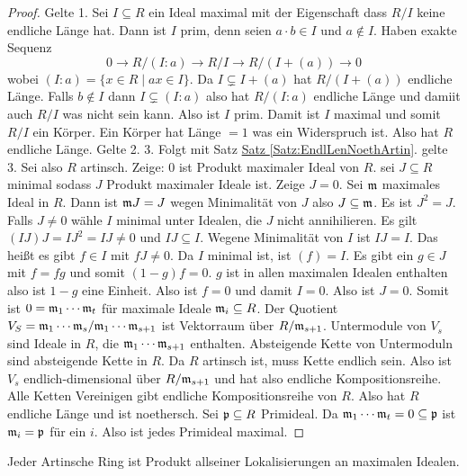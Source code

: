 \begin{proof}
    Gelte 1. Sei \(I\subseteq R\) ein Ideal maximal mit der Eigenschaft dass \(R/I\) keine endliche Länge hat. Dann ist \(I\) prim, denn seien \(a\cdot b\in I\) und \(a\not\in I\). Haben exakte Sequenz
    \[0\to R/(I:a)\to R/I\to R/(I+(a))\to 0\] wobei \((I:a)=\{x\in R\mid ax\in I\}\). Da \(I\subsetneq I+(a)\) hat \(R/(I+(a))\) endliche Länge. Falls \(b\not\in I\) dann \(I\subsetneq (I:a)\) also hat \(R/(I:a)\) endliche Länge und damiit auch \(R/I\) was nicht sein kann. Also ist \(I\) prim. Damit ist \(I\) maximal und somit \(R/I\) ein Körper. Ein Körper hat Länge \(=1\) was ein Widerspruch ist.
    Also hat \(R\) endliche Länge.
    Gelte 2. 3. Folgt mit Satz \hyperref[Satz:EndlLenNoethArtin]{Satz \ref{Satz:EndlLenNoethArtin}}. gelte 3. Sei also \(R\) artinsch. Zeige: \(0\) ist Produkt maximaler Ideal von \(R\).
    sei \(J\subseteq R\) minimal sodass \(J\) Produkt maximaler Ideale ist. Zeige \(J=0\).
    Sei \(\mathfrak{m} \) maximales Ideal in \(R\). Dann ist \(\mathfrak{m} J=J\) wegen Minimalität von \(J\) also \(J\subseteq \mathfrak{m}\). Es ist \(J^2=J\).
    Falls \(J\neq 0\) wähle \(I\) minimal unter Idealen, die \(J\) nicht annihilieren.
    Es gilt \((IJ)J=IJ^2=IJ\neq 0\) und \(IJ\subseteq I\). Wegene Minimalität von \(I\) ist \(IJ=I\). Das heißt es gibt \(f\in I\) mit \(fJ\neq 0\). Da \(I\) minimal ist, ist \((f)=I\). Es gibt ein \(g\in J\) mit \(f=fg\) und somit \((1-g)f=0\).
    \(g\) ist in allen maximalen Idealen enthalten also ist \(1-g\) eine Einheit. Also ist \(f=0\) und damit \(I=0\). Also ist \(J=0\).
    Somit ist \(0=\mathfrak{m}_1\cdots \mathfrak{m}_t\) für maximale Ideale \(\mathfrak{m}_i\subseteq R\).
    Der Quotient \(V_S=\mathfrak{m}_1\cdots \mathfrak{m}_s/\mathfrak{m}_1\cdots \mathfrak{m}_{s+1}\) ist Vektorraum über \(R/\mathfrak{m}_{s+1}\). Untermodule von \(V_s\) sind Ideale in \(R\), die \(\mathfrak{m}_1\cdots \mathfrak{m}_{s+1}\) enthalten.
    Absteigende Kette von Untermoduln sind absteigende Kette in \(R\). Da \(R\) artinsch ist, muss Kette endlich sein.
    Also ist \(V_s\) endlich-dimensional über \(R/\mathfrak{m}_{s+1}\) und hat also endliche Kompositionsreihe. Alle Ketten Vereinigen gibt endliche Kompositionsreihe von \(R\). Also hat \(R\) endliche Länge und ist noethersch. Sei \(\mathfrak{p}\subseteq R\) Primideal. Da \(\mathfrak{m}_1\cdots \mathfrak{m}_t=0\subseteq \mathfrak{p}\) ist \(\mathfrak{m}_i=\mathfrak{p}\) für ein \(i\). Also ist jedes Primideal maximal.
\end{proof}
\begin{Kor}\label{Kor:StruktArtinring}
    Jeder Artinsche Ring ist Produkt allseiner Lokalisierungen an maximalen Idealen.
\end{Kor}
